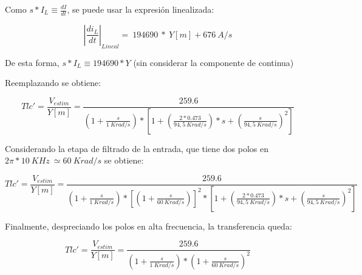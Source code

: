 \noindent Como $s*I_L\equiv \frac{dI}{dt}$, se puede usar la expresi\'{o}n linealizada:

\begin{equation} \label{eq_TLC_deriv_4}
	{\left|\frac{{di}_L}{dt}\right|}_{Lineal}=\ 194690\ *\ Y[m]+676\ A/s
\end{equation}

\noindent De esta forma,  $s*I_L\equiv 194690*Y$ (sin considerar la componente de continua)

\noindent Reemplazando se obtiene:

\begin{equation} \label{eq_TLC_deriv_5}
	{Tlc'}=\frac{V_{estim}}{Y[m]}=\frac{259.6}{(1+\frac{s}{1\ Krad/s})*[1+(\frac{2*0.473}{94,5\ Krad/s})*s+(\frac{s}{94,5\ Krad/s})^2]}
\end{equation}

\noindent Considerando la etapa de filtrado de la entrada, que tiene dos polos en $2\pi *10\ KHz\ \simeq 60\ Krad/s$ se obtiene:

\begin{equation} \label{eq_TLC_deriv_6}
	{Tlc'}=\frac{V_{estim}}{Y[m]}=\frac{259.6}{(1+\frac{s}{1\ Krad/s})*{[(1+\frac{s}{60\ Krad/s})]}^2*[1+(\frac{2*0.473}{94,5\ Krad/s})*s+(\frac{s}{94,5\ Krad/s})^2]}
\end{equation}

\noindent Finalmente, despreciando los polos en alta frecuencia, la transferencia queda:

\begin{equation} \label{eq_TLC_deriv_7}
	{Tlc'}=\frac{V_{estim}}{Y[m]}=\frac{259.6}{(1+\frac{s}{1\ Krad/s})*{(1+\frac{s}{60\ Krad/s})}^2}
\end{equation}